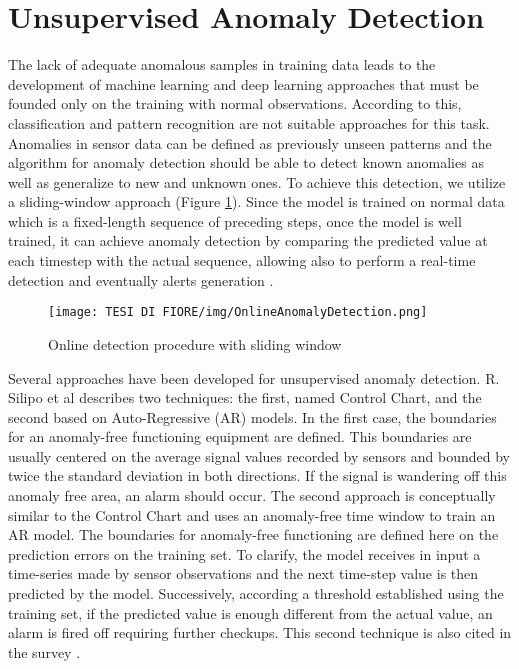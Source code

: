 \section{Unsupervised Anomaly Detection}
The lack of adequate anomalous samples in training data leads to the development of machine learning and deep learning approaches that must be founded only on the training with normal observations. According to this, classification and pattern recognition are not suitable approaches for this task. Anomalies in sensor data can be defined as previously unseen patterns and the algorithm for anomaly detection should be able to detect known anomalies as well as generalize to new and unknown ones. To achieve this detection, we utilize a sliding-window approach (Figure \ref{anomaly_detection_with_sliding_window}). Since the model is trained on normal data which is a fixed-length sequence of preceding steps, once the model is well trained, it can achieve anomaly detection by comparing the predicted value at each timestep with the actual sequence, allowing also to perform a real-time detection and eventually alerts generation \cite{9UnsupervisedOnlineAnomalyDetectionMultivariate}.
\begin{figure}[ht]
\texttt{[image: TESI DI FIORE/img/OnlineAnomalyDetection.png]}
\centering
\caption{Online detection procedure with sliding window \cite{9UnsupervisedOnlineAnomalyDetectionMultivariate}}
\label{anomaly_detection_with_sliding_window}
\end{figure}
Several approaches have been developed for unsupervised anomaly detection. R. Silipo et al \cite{8AnomalyDetectionUnsupervised2} describes two techniques: the first, named Control Chart, and the second based on Auto-Regressive (AR) models. In the first case, the boundaries for an anomaly-free functioning equipment are defined. This boundaries are usually centered on the average signal values recorded by sensors and bounded by twice the standard deviation in both directions. If the signal is wandering off this anomaly free area, an alarm should occur. The second approach is conceptually similar to the Control Chart and uses an anomaly-free time window to train an AR model. The boundaries for anomaly-free functioning are defined here on the prediction errors on the training set. To clarify, the model receives in input a time-series made by sensor observations and the next time-step value is then predicted by the model. Successively, according a threshold established using the training set, if the predicted value is enough different from the actual value, an alarm is fired off requiring further checkups. This second technique is also cited in the survey \cite{6AnomalyIoTTimeSeries}.\\
